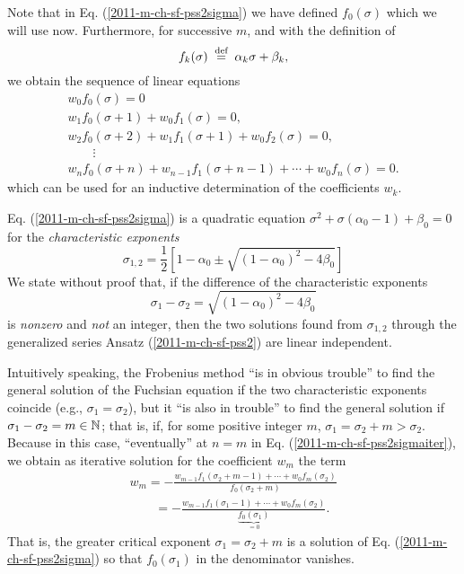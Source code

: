 Note that in  Eq. (\ref{2011-m-ch-sf-pss2sigma}) we have defined $f_0(\sigma )$ which we will use now.
Furthermore, for successive $m$, and with the definition of
\begin{equation}
f_k(\sigma ) \stackrel{{\tiny \textrm{ def }}}{=} \alpha_k \sigma +\beta_k,
\end{equation}
we obtain the sequence of linear equations
\begin{equation}
\begin{split}
w_0f_0(\sigma ) =0\\
w_1f_0(\sigma +1)+w_0f_1(\sigma )  =0,\\
w_2f_0(\sigma +2)+w_1f_1(\sigma +1) +w_0f_2(\sigma )  =0,\\
\qquad \vdots      \\
w_nf_0(\sigma+ n)   +w_{n-1}f_1(\sigma+ n-1)+ \cdots +w_0f_n(\sigma )  =0.
\end{split}
\label{2011-m-ch-sf-pss2sigmaiter}
\end{equation}
which can be used for an inductive determination of the coefficients $w_k$.

Eq. (\ref{2011-m-ch-sf-pss2sigma}) is a quadratic equation
$   \sigma^2 +\sigma (\alpha_{0}-1 ) +  \beta_{0}  =0$
for the
{\em characteristic exponents}
\begin{equation}
\sigma_{1,2} = \frac{1}{2} \left[1 - \alpha_{0} \pm \sqrt{(1 - \alpha_{0})^2-4  \beta_{0}}\right]
\end{equation}
We state without proof that, if the difference of the characteristic exponents
\begin{equation}
\sigma_1 - \sigma_2  =   \sqrt{(1 - \alpha_{0})^2-4  \beta_{0}}
\end{equation}
is  {\em nonzero} and {\em not} an integer, then the two solutions found from   $\sigma_{1,2}$
through  the generalized series Ansatz  (\ref{2011-m-ch-sf-pss2}) are linear independent.

Intuitively speaking, the Frobenius method ``is in obvious trouble'' to find
the general solution of the Fuchsian equation
if the two characteristic exponents coincide (e.g., $\sigma_1 = \sigma_2$),
but it ``is also in trouble'' to find
the general solution
if  $\sigma_1 - \sigma_2 = m \in {\Bbb N}$;
that is, if, for some positive integer $m$,  $\sigma_1  = \sigma_2 + m > \sigma_2$.
Because in this case, ``eventually''
at $n=m$ in Eq. (\ref{2011-m-ch-sf-pss2sigmaiter}),
we obtain as iterative solution for the coefficient $w_m$ the term
\begin{equation}
\begin{split}
w_m  = - \frac{w_{m-1}f_1(\sigma_2 + m-1)+ \cdots +w_0f_m(\sigma_2  )}{f_0(\sigma_2 + m)}
\\
\qquad  = - \frac{w_{m-1}f_1(\sigma_1-1)+ \cdots +w_0f_m(\sigma_2  )}{\underbrace{f_0(\sigma_1)}_{ = 0}}
.
\end{split}
\end{equation}
That is,  the greater critical exponent $\sigma_1=\sigma_2 + m$   is a solution
of Eq. (\ref{2011-m-ch-sf-pss2sigma}) so that $f_0(\sigma_1)$ in the denominator vanishes.

